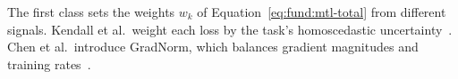 The first class sets the weights $w_k$ of Equation~\ref{eq:fund:mtl-total} from
different signals. Kendall et al.\ weight each loss by the task's homoscedastic
uncertainty~\cite{kendall2018uncertainty}. Chen et al.\ introduce GradNorm, which
balances gradient magnitudes and training rates~\cite{chen2018gradnorm}.
%

